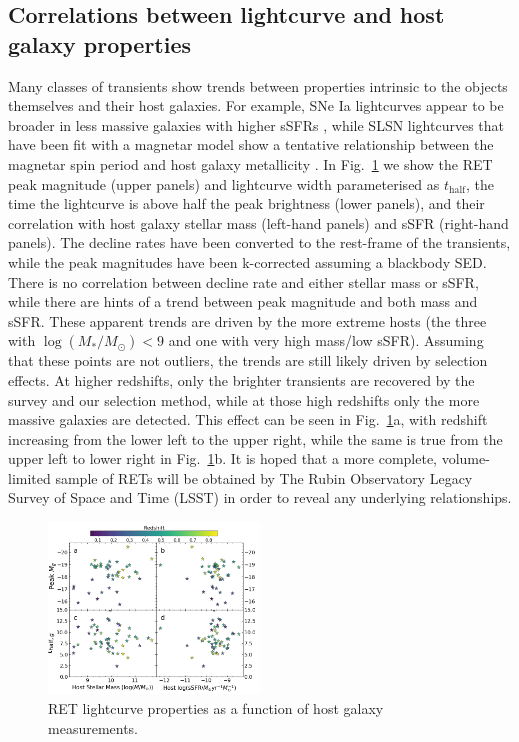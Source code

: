 \documentclass[fleqn,usenatbib,]{mnras}
\begin{document}
\subsection{Correlations between lightcurve and host galaxy properties \label{subsec:disc_correlations}}
Many classes of transients show trends between properties intrinsic to the objects themselves and their host galaxies. For example, SNe Ia lightcurves appear to be broader in less massive galaxies with higher sSFRs \citep{Sullivan2006,Neill2009,Howell2009,Sullivan2010,Roman2018,Kelsey2020}, while SLSN lightcurves that have been fit with a magnetar model show a tentative relationship between the magnetar spin period and host galaxy metallicity \citep{Chen2016a}. In Fig.~\ref{fig:ret_v_host} we show the RET peak magnitude (upper panels) and lightcurve width parameterised as $t_{\mathrm{half}}$, the time the lightcurve is above half the peak brightness (lower panels), and their correlation with host galaxy stellar mass (left-hand panels) and sSFR (right-hand panels). The decline rates have been converted to the rest-frame of the transients, while the peak magnitudes have been k-corrected assuming a blackbody SED. There is no correlation between decline rate and either stellar mass or sSFR, while there are hints of a trend between peak magnitude and both mass and sSFR. These apparent trends are driven by the more extreme hosts (the three with $\log\left(M_*/M_{\odot}\right) < 9$ and one with very high mass/low sSFR). Assuming that these points are not outliers, the trends are still likely driven by selection effects. At higher redshifts, only the brighter transients are recovered by the survey and our selection method, while at those high redshifts only the more massive galaxies are detected. This effect can be seen in Fig.~\ref{fig:ret_v_host}a, with redshift increasing from the lower left to the upper right, while the same is true from the upper left to lower right in Fig.~\ref{fig:ret_v_host}b. It is hoped that a more complete, volume-limited sample of RETs will be obtained by The Rubin Observatory Legacy Survey of Space and Time (LSST) in order to reveal any underlying relationships.

\label{sec:disc}
\begin{figure}
\includegraphics[width=0.5\textwidth]{figs/RET_vs_host.png}
\caption{RET lightcurve properties as a function of host galaxy measurements.
\label{fig:ret_v_host}}
\end{figure}
\end{document}
